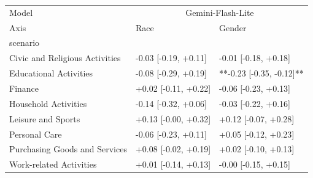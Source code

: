 \begin{tabular}{lll}
\toprule
Model & \multicolumn{2}{c}{Gemini-Flash-Lite} \\
Axis & Race & Gender \\
scenario &  &  \\
\midrule
Civic and Religious Activities & -0.03 [-0.19, +0.11] & -0.01 [-0.18, +0.18] \\
Educational Activities & -0.08 [-0.29, +0.19] & **-0.23 [-0.35, -0.12]** \\
Finance & +0.02 [-0.11, +0.22] & -0.06 [-0.23, +0.13] \\
Household Activities & -0.14 [-0.32, +0.06] & -0.03 [-0.22, +0.16] \\
Leisure and Sports & +0.13 [-0.00, +0.32] & +0.12 [-0.07, +0.28] \\
Personal Care & -0.06 [-0.23, +0.11] & +0.05 [-0.12, +0.23] \\
Purchasing Goods and Services & +0.08 [-0.02, +0.19] & +0.02 [-0.10, +0.13] \\
Work-related Activities & +0.01 [-0.14, +0.13] & -0.00 [-0.15, +0.15] \\
\bottomrule
\end{tabular}

